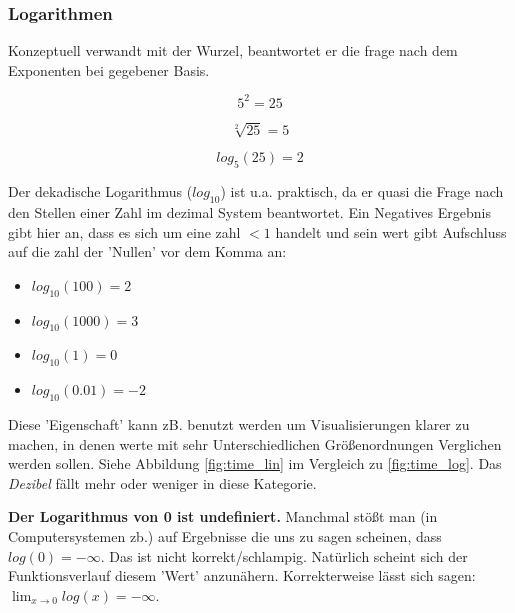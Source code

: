 \subsubsection{Logarithmen}
Konzeptuell verwandt mit der Wurzel, beantwortet er die frage nach dem Exponenten bei gegebener Basis.

$$ 5 ^2 =25 $$

$$\sqrt[2]{25} = 5$$

$$ log_5 (25) = 2$$




Der dekadische Logarithmus ($log_{10}$) ist u.a. praktisch, da er quasi die Frage nach den Stellen einer Zahl im dezimal System beantwortet. Ein Negatives Ergebnis gibt hier an, dass es sich um eine zahl $<1$ handelt und sein wert gibt Aufschluss auf die zahl der 'Nullen' vor dem Komma an:

\begin{itemize}
    

\item  $ log_{10}(100) = 2$
\item  $ log_{10}(1000) = 3$
\item  $ log_{10}(1) = 0$
\item  $ log_{10}(0.01) = -2$
\end{itemize}

Diese 'Eigenschaft' kann zB. benutzt werden um Visualisierungen klarer zu machen, in denen werte mit sehr Unterschiedlichen Größenordnungen Verglichen werden sollen. Siehe Abbildung \ref{fig:time_lin} im Vergleich zu \ref{fig:time_log}. Das \emph{Dezibel} fällt mehr oder weniger in diese Kategorie. 

\textbf{Der Logarithmus von 0 ist undefiniert.} Manchmal stößt man (in Computersystemen zb.) auf Ergebnisse die uns zu sagen scheinen, dass  $log(0)=-\infty$. Das ist nicht korrekt/schlampig. Natürlich scheint sich der Funktionsverlauf diesem 'Wert' anzunähern. Korrekterweise lässt sich sagen: $\lim_{x\to 0} log(x)=-\infty$. 


